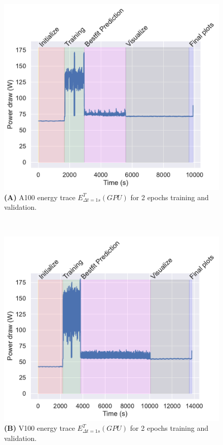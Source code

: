 \documentclass[utf8]{FrontiersinVancouver} %
\begin{document}
\begin{figure}[htb]

  \begin{center}

     \begin{minipage}[b]{0.43\textwidth}
       \includegraphics[width=1.0\linewidth]{images/a100-shaded-energy-2-epochs}
        {\bf (A)} A100 energy trace $E^T_{\Delta t=1s}(GPU)$ for 2 epochs training and validation.
    \end{minipage}
     \ \
     \begin{minipage}[b]{0.43\textwidth}
        \includegraphics[width=1.0\linewidth]{images/v100-shaded-energy-2-epochs}
        {\bf (B)}  V100 energy trace $E^T_{\Delta t=1s}(GPU)$ for 2 epochs training and validation.
     \end{minipage}


\end{center}
\end{figure}
\end{document}
